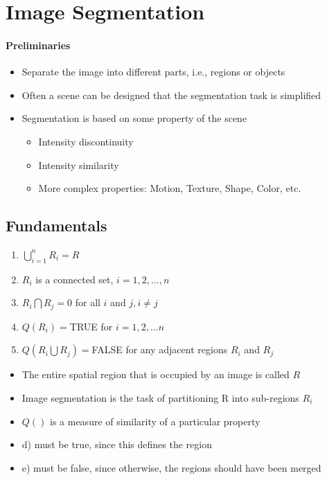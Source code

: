 \section{Image Segmentation}
\paragraph{Preliminaries}
\begin{itemize}
\item Separate the image into different parts, i.e., regions or objects
\item Often a scene can be designed that the segmentation task is simplified
\item Segmentation is based on some property of the scene
\begin{itemize}
\item Intensity discontinuity
\item Intensity similarity
\item More complex properties: Motion, Texture, Shape, Color, etc.
\end{itemize}
\end{itemize}

\subsection{Fundamentals}
\begin{multicols}{2}
\begin{enumerate}[label={\alph*)}]
\item $\bigcup\limits_{i=1}^{n}R_i=R$
\item $R_i$ is a connected set, $i=1,2,...,n$
\item $R_i\bigcap R_j = 0$ for all $i$ and $j, i\neq j$
\item $Q(R_i)=$TRUE for $i=1,2,...n$
\item $Q(R_i\bigcup R_j)=$FALSE for any adjacent regions $R_i$ and $R_j$
\end{enumerate}
\vfill
\columnbreak
\begin{itemize}
\item The entire spatial region that is occupied by an image is called $R$
\item Image segmentation is the task of partitioning R into sub-regions $R_i$
\item $Q()$ is a measure of similarity of a particular property
\item d) must be true, since this defines the region
\item e) must be false, since otherwise, the regions should have been merged
\end{itemize}
\end{multicols}

